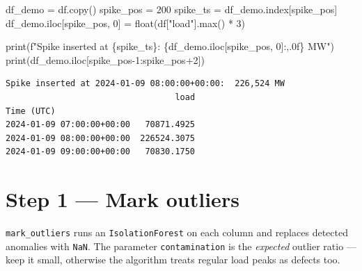 \documentclass[
  english,
  letterpaper,
]{scrbook}
\newenvironment{Shaded}{\begin{snugshade}}{\end{snugshade}}
\newcommand{\BuiltInTok}[1]{\textcolor[rgb]{0.00,0.23,0.31}{#1}}
\newcommand{\DecValTok}[1]{\textcolor[rgb]{0.68,0.00,0.00}{#1}}
\newcommand{\NormalTok}[1]{\textcolor[rgb]{0.00,0.23,0.31}{#1}}
\newcommand{\OperatorTok}[1]{\textcolor[rgb]{0.37,0.37,0.37}{#1}}
\newcommand{\SpecialCharTok}[1]{\textcolor[rgb]{0.37,0.37,0.37}{#1}}
\newcommand{\SpecialStringTok}[1]{\textcolor[rgb]{0.13,0.47,0.30}{#1}}
\newcommand{\StringTok}[1]{\textcolor[rgb]{0.13,0.47,0.30}{#1}}
\begin{document}
\protect{}\label{inject-spike}
\begin{Shaded}
\begin{Highlighting}[]
\NormalTok{df\_demo }\OperatorTok{=}\NormalTok{ df.copy()}
\NormalTok{spike\_pos }\OperatorTok{=} \DecValTok{200}
\NormalTok{spike\_ts }\OperatorTok{=}\NormalTok{ df\_demo.index[spike\_pos]}
\NormalTok{df\_demo.iloc[spike\_pos, }\DecValTok{0}\NormalTok{] }\OperatorTok{=} \BuiltInTok{float}\NormalTok{(df[}\StringTok{"load"}\NormalTok{].}\BuiltInTok{max}\NormalTok{() }\OperatorTok{*} \DecValTok{3}\NormalTok{)}

\BuiltInTok{print}\NormalTok{(}\SpecialStringTok{f"Spike inserted at }\SpecialCharTok{\{}\NormalTok{spike\_ts}\SpecialCharTok{\}}\SpecialStringTok{:  }\SpecialCharTok{\{}\NormalTok{df\_demo}\SpecialCharTok{.}\NormalTok{iloc[spike\_pos, }\DecValTok{0}\NormalTok{]}\SpecialCharTok{:,.0f\}}\SpecialStringTok{ MW"}\NormalTok{)}
\BuiltInTok{print}\NormalTok{(df\_demo.iloc[spike\_pos}\OperatorTok{{-}}\DecValTok{1}\NormalTok{:spike\_pos}\OperatorTok{+}\DecValTok{2}\NormalTok{])}
\end{Highlighting}
\end{Shaded}

\begin{verbatim}
Spike inserted at 2024-01-09 08:00:00+00:00:  226,524 MW
                                  load
Time (UTC)                            
2024-01-09 07:00:00+00:00   70871.4925
2024-01-09 08:00:00+00:00  226524.3075
2024-01-09 09:00:00+00:00   70830.1750
\end{verbatim}

\section{Step 1 --- Mark outliers}\label{step-1-mark-outliers}

\texttt{mark\_outliers} runs an \texttt{IsolationForest} on each column
and replaces detected anomalies with \texttt{NaN}. The parameter
\texttt{contamination} is the \emph{expected} outlier ratio --- keep it
small, otherwise the algorithm treats regular load peaks as defects too.
\end{document}
